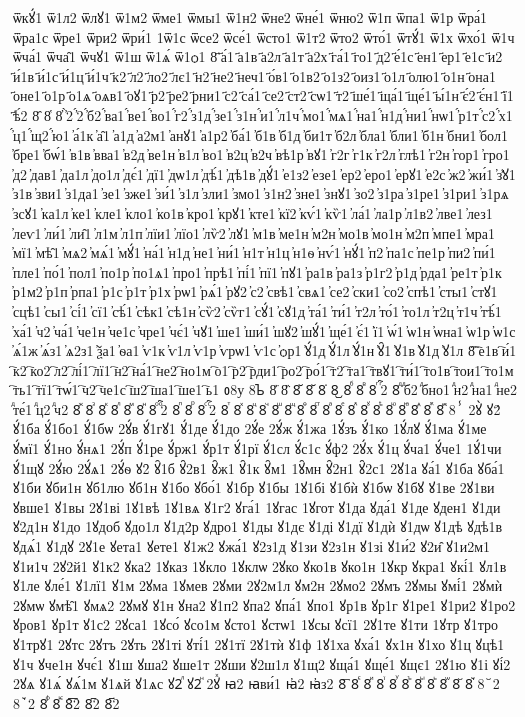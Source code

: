 {ѿкꙋ́1
ѿ1л2
ѿлꙋ1
ѿ1м2
ѿме1
ѿмы1
ѿ1н2
ѿне2
ѿне́1
ѿню2
ѿ1п
ѿпа1
ѿ1р
ѿра́1
ѿра1с
ѿре1
ѿри2
ѿри́1
1ѿ1с
ѿсе2
ѿсе́1
ѿсто1
ѿ1т2
ѿто2
ѿто́1
ѿтꙋ́1
ѿ1х
ѿхо́1
ѿ1ч
ѿча́1
ѿча̑1
ѿчꙋ1
ѿ1ш
ѿ1ѧ́
ѿ1ѻ1
8҃
҃а́1
҃а1в
҃а2л
҃а1т
҃а2х
҃га́1
҃го1
҃д2
҃е́1с
҃ен1
҃ер1
҃е1с
҃и2
҃и́1в
҃и́1с
҃и́1ц
҃и́1ч
҃к2
҃л2
҃ло2
҃лє1
҃н2
҃не2
҃неч1
҃о́в1
҃о1в2
҃о1з2
҃оиз1
҃о1л
҃олю1
҃о1н
҃она1
҃оне1
҃о1р
҃о1ѧ
҃оѧв1
҃оꙋ1
҃р2
҃ре2
҃рни1
҃с2
҃са́1
҃се2
҃ст2
҃сѡ1
҃т2
҃ше́1
҃ща́1
҃ще́1
҃ы́1н
҃є́2
҃є́н1
҃ї1
҃ѣ́2
8҄
8҅
8҆
҆̀2
҆́2
҆́б2
҆́ва1
҆́ве1
҆́во1
҆́г2
҆́з1д
҆́зе1
҆́з1н
҆́и1
҆́л1ч
҆́мо1
҆́мѧ1
҆́на1
҆́н1д
҆́ни1
҆́нѡ1
҆́р1т
҆́с2
҆́х1
҆́ц1
҆́щ2
҆́ю1
҆а́1к
҆а̑1
҆а1д
҆а2м1
҆анꙋ1
҆а1р2
҆ба́1
҆б1в
҆б1д
҆би1т
҆б2л
҆бла1
҆бли1
҆б1н
҆бни1
҆бол1
҆бре1
҆бѡ́1
҆в1в
҆вва1
҆в2д
҆ве1н
҆в1л
҆во1
҆в2ц
҆в2ч
҆вѣ1р
҆вꙋ1
҆г2г
҆г1к
҆г2л
҆глѣ1
҆г2н
҆гор1
҆гро1
҆д2
҆дав1
҆да1л
҆до1л
҆дє́1
҆дї1
҆дѡ1л
҆дѣ́1
҆дѣ1в
҆дꙋ́1
҆е1з2
҆езе1
҆ер2
҆еро1
҆ерꙋ1
҆е2с
҆ж2
҆жи́1
҆з̾ꙋ1
҆з1в
҆зви1
҆з1да1
҆зе1
҆зже1
҆зи́1
҆з1л
҆зли1
҆змо1
҆з1н2
҆зне1
҆знꙋ1
҆зо2
҆з1ра
҆з1ре1
҆з1ри1
҆з1рѧ
҆зсꙋ1
҆ка1л
҆ке1
҆кле1
҆кло1
҆ко1в
҆кро1
҆крꙋ1
҆кте1
҆кї2
҆кѵ́1
҆кѷ1
҆ла́1
҆ла1р
҆л1в2
҆лве1
҆лез1
҆леѵ1
҆ли́1
҆ли̑1
҆л1м
҆л1п
҆лїи1
҆лїо1
҆лѷ2
҆лꙋ1
҆м1в
҆ме1н
҆м2н
҆мо1в
҆мо1н
҆м2п
҆мпе1
҆мра1
҆мї1
҆мѣ̑1
҆мѧ2
҆мѧ́1
҆мꙋ́1
҆на́1
҆н1д
҆не1
҆ни́1
҆н1т
҆н1ц
҆н1ѳ
҆нѵ́1
҆нꙋ́1
҆п2
҆па1с
҆пе1р
҆пи2
҆пи́1
҆пле1
҆по́1
҆пол1
҆по1р
҆по1ѧ1
҆про1
҆прѣ1
҆пі́1
҆пї1
҆пꙋ1
҆ра1в
҆ра1з
҆р1г2
҆р1д
҆рда1
҆ре1т
҆р1к
҆р1м2
҆р1п
҆рпа1
҆р1с
҆р1т
҆р1х
҆рѡ1
҆рѧ́1
҆рꙋ2
҆с2
҆свѣ1
҆свѧ1
҆се2
҆ски1
҆со2
҆спѣ1
҆сты1
҆стꙋ1
҆сцѣ1
҆сы1
҆сі́1
҆сї1
҆сѣ́1
҆сѣк1
҆сѣ1н
҆сѷ2
҆сѷг1
҆сꙋ́1
҆сꙋ1д
҆та́1
҆ти́1
҆т2л
҆то́1
҆то1л
҆т2ц
҆т1ч
҆тѣ́1
҆ха́1
҆ч2
҆ча́1
҆че1н
҆че1с
҆чре1
҆чє́1
҆чꙋ1
҆ше1
҆ши́1
҆шꙋ2
҆шꙋ́1
҆ще́1
҆є́1
҆ї1
҆ѡ́1
҆ѡ1н
҆ѡна1
҆ѡ1р
҆ѡ1с
҆ѧ́1ж
҆ѧ́з1
҆ѧ2з1
҆ѯа1
҆ѳа1
҆ѵ1к
҆ѵ1л
҆ѵ1р
҆ѵрѡ1
҆ѵ1с
҆ѻр1
҆ꙋ́1д
҆ꙋ́1л
҆ꙋ́1н
҆ꙋ̑1
҆ꙋ1в
҆ꙋ1д
҆ꙋ1л
8҇
҇е1в
҇и́1
҇к2
҇ко2
҇л2
҇лі́1
҇лї1
҇н2
҇на́1
҇не2
҇но1м
҇о1
҇р2
҇рди1
҇ро2
҇ро́1
҇т2
҇та1
҇твꙋ1
҇ти́1
҇то1в
҇тои1
҇то1м
҇ть1
҇тї1
҇тѡ́1
҇ч2
҇че1с
҇ш2
҇ша1
҇ше1
҇ь1
ᲂ8у  
8ᲆ 
8᷀
8᷁
8᷶
8᷷
8᷸
8᷹
8ⷠ
8ⷡ
8ⷢ
ⷢ҇2
8ⷣ
ⷣб2
ⷣбно1
ⷣн2
ⷣна1
ⷣне2
ⷣте́1
ⷣц2
ⷣч2
8ⷤ
8ⷥ
8ⷦ
8ⷧ
8ⷨ
8ⷩ
8ⷪ
ⷪ҇2
8ⷫ
8ⷬ
8ⷭ
ⷭ҇2
8ⷮ
8ⷯ
8ⷰ
8ⷱ
8ⷲ
8ⷳ
8ⷴ
8ⷵ
8ⷶ
8ⷷ
8ⷸ
8ⷹ
8ⷺ
8ⷻ
8ⷼ
8ⷽ
8ⷾ
8ⷿ
8ⸯ 
2ꙋ̀
ꙋ2́
ꙋ́1ба
ꙋ́1бо1
ꙋ́1бѡ
2ꙋ́в
ꙋ́1гꙋ1
ꙋ́1де
ꙋ́1до
2ꙋ́е
2ꙋ́ж
ꙋ́1жа
1ꙋ́зъ
ꙋ́1ко
1ꙋ́лꙋ
ꙋ́1ма
ꙋ́1ме
ꙋ́мї1
ꙋ́1но
ꙋ́нѧ1
2ꙋ́п
ꙋ́1ре
ꙋ́рж1
ꙋ́р1т
ꙋ́1рї
ꙋ́1сл
ꙋ́с1с
ꙋ́ф2
2ꙋ́х
ꙋ́1ц
ꙋ́ча1
ꙋ́че1
1ꙋ́1чи
ꙋ́1щꙋ
2ꙋ́ю
2ꙋ́ѧ1
2ꙋ́ѳ
ꙋ2̑
ꙋ̑1б
ꙋ̑2в1
ꙋ̑ж1
ꙋ̑1к
ꙋ̑м1
1ꙋ̑мн
ꙋ̑2н1
ꙋ̑2с1
2ꙋ1а
ꙋа́1
ꙋ1ба
ꙋба́1
ꙋ1би
ꙋби1н
ꙋб1лю
ꙋб1н
ꙋ1бо
ꙋбо́1
ꙋ1бр
ꙋ1бы
1ꙋ1бі
ꙋ1бѝ
ꙋ1бѡ
ꙋ1бꙋ
ꙋ1ве
2ꙋ1ви
ꙋвше1
ꙋ1вы
2ꙋ1ві
1ꙋ1вѣ
1ꙋ1вѧ
ꙋ1г2
ꙋга́1
1ꙋгас
1ꙋгот
ꙋ1да
ꙋда́1
ꙋ1де
ꙋден1
ꙋ1ди
ꙋ2д1н
ꙋ1до
1ꙋдоб
ꙋдо1л
ꙋ1д2р
ꙋдро1
ꙋ1ды
ꙋ1дє
ꙋ1ді
ꙋ1дї
ꙋ1дѝ
ꙋ1дѡ
ꙋ1дѣ
ꙋдѣ1в
ꙋдѧ́1
ꙋ1дꙋ
2ꙋ1е
ꙋета1
ꙋете1
ꙋ1ж2
ꙋжа́1
ꙋ2з1д
ꙋ1зи
ꙋ2з1н
ꙋ1зі
ꙋ1и́2
ꙋ2и̑
ꙋ1и2м1
ꙋ1и1ч
2ꙋ2й1
ꙋ1к2
ꙋка2
1ꙋказ
1ꙋкло
1ꙋклѡ
2ꙋко
ꙋко1в
ꙋко1н
1ꙋкр
ꙋкра1
ꙋкі́1
ꙋл1в
ꙋ1ле
ꙋле́1
ꙋ1лї1
ꙋ1м
2ꙋма
1ꙋмев
2ꙋми
2ꙋ2м1л
ꙋм2н
2ꙋмо2
2ꙋмъ
2ꙋмы
ꙋмі́1
2ꙋмѝ
2ꙋмѡ
ꙋмѣ̑1
ꙋмѧ2
2ꙋмꙋ
ꙋ1н
ꙋна2
ꙋ1п2
ꙋпа2
ꙋпа́1
ꙋпо1
ꙋр1в
ꙋр1г
ꙋ1ре1
ꙋ1ри2
ꙋ1ро2
ꙋров1
ꙋр1т
ꙋ1с2
2ꙋса1
1ꙋсо́
ꙋсо1м
ꙋсто1
ꙋстѡ1
1ꙋсы
ꙋсї1
2ꙋ1те
ꙋ1ти
1ꙋтр
ꙋ1тро
ꙋ1трꙋ1
2ꙋтс
2ꙋтъ
2ꙋть
2ꙋ1ті
ꙋті́1
2ꙋ1тї
2ꙋ1тѝ
ꙋ1ф
1ꙋ1ха
ꙋха́1
ꙋх1н
ꙋ1хо
ꙋ1ц
ꙋцѣ1
ꙋ1ч
ꙋче1н
ꙋчє́1
ꙋ1ш
ꙋша2
ꙋше1т
2ꙋши
ꙋ2ш1л
ꙋ1щ2
ꙋща́1
ꙋще́1
ꙋщє1
2ꙋ1ю
ꙋ1і
ꙋі́2
2ꙋѧ
ꙋ1ѧ́
ꙋѧ́1м
ꙋ1ѧй
ꙋ1ѧс
ꙋ2ⷧ
ꙋ2ⷩ
2ꙋⷯ
ꙗ2
ꙗви́1
ꙗ҆2
ꙗ҆з2
8꙯
8ꙴ
8ꙵ
8ꙶ
8ꙷ
8ꙸ
8ꙹ
8ꙺ
8ꙻ
8꙼
8꙽
8꙾2   
8ꙿ2   
8ꚞ
8ꚟ
8︦2   
8︮2   
8︯2   
}
